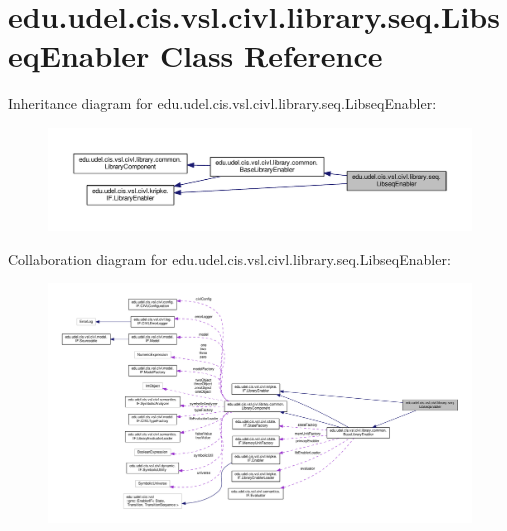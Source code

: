 \hypertarget{classedu_1_1udel_1_1cis_1_1vsl_1_1civl_1_1library_1_1seq_1_1LibseqEnabler}{}\section{edu.\+udel.\+cis.\+vsl.\+civl.\+library.\+seq.\+Libseq\+Enabler Class Reference}
\label{classedu_1_1udel_1_1cis_1_1vsl_1_1civl_1_1library_1_1seq_1_1LibseqEnabler}


Inheritance diagram for edu.\+udel.\+cis.\+vsl.\+civl.\+library.\+seq.\+Libseq\+Enabler\+:
\nopagebreak
\begin{figure}[H]
\begin{center}
\leavevmode
\includegraphics[width=350pt]{classedu_1_1udel_1_1cis_1_1vsl_1_1civl_1_1library_1_1seq_1_1LibseqEnabler__inherit__graph}
\end{center}
\end{figure}


Collaboration diagram for edu.\+udel.\+cis.\+vsl.\+civl.\+library.\+seq.\+Libseq\+Enabler\+:
\nopagebreak
\begin{figure}[H]
\begin{center}
\leavevmode
\includegraphics[width=350pt]{classedu_1_1udel_1_1cis_1_1vsl_1_1civl_1_1library_1_1seq_1_1LibseqEnabler__coll__graph}
\end{center}
\end{figure}
